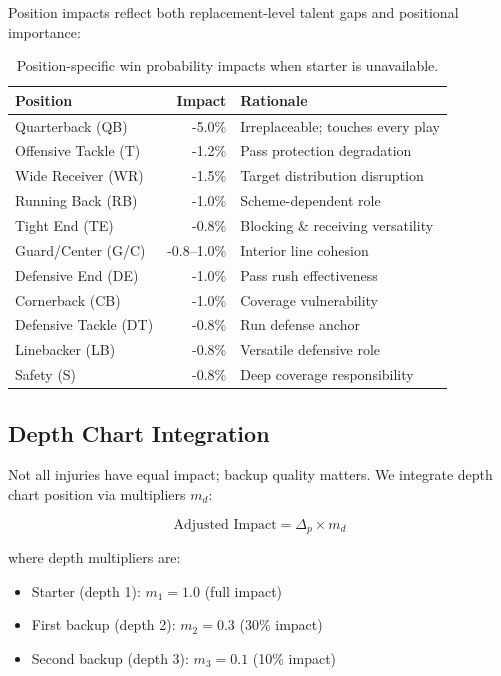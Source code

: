 Position impacts reflect both replacement-level talent gaps and positional importance:

\begin{table}[h]
\centering
\caption[Position-based injury impacts]{Position-specific win probability impacts when starter is unavailable.}
\label{tab:injury-impacts}
\begin{tabular}{lrl}
\toprule
\textbf{Position} & \textbf{Impact} & \textbf{Rationale} \\
\midrule
Quarterback (QB) & -5.0\% & Irreplaceable; touches every play \\
Offensive Tackle (T) & -1.2\% & Pass protection degradation \\
Wide Receiver (WR) & -1.5\% & Target distribution disruption \\
Running Back (RB) & -1.0\% & Scheme-dependent role \\
Tight End (TE) & -0.8\% & Blocking \& receiving versatility \\
Guard/Center (G/C) & -0.8--1.0\% & Interior line cohesion \\
\midrule
Defensive End (DE) & -1.0\% & Pass rush effectiveness \\
Cornerback (CB) & -1.0\% & Coverage vulnerability \\
Defensive Tackle (DT) & -0.8\% & Run defense anchor \\
Linebacker (LB) & -0.8\% & Versatile defensive role \\
Safety (S) & -0.8\% & Deep coverage responsibility \\
\bottomrule
\end{tabular}
\end{table}

\subsection{Depth Chart Integration}

Not all injuries have equal impact; backup quality matters. We integrate depth chart position via multipliers $m_d$:

\begin{equation}
\text{Adjusted Impact} = \Delta_p \times m_d
\end{equation}

where depth multipliers are:
\begin{itemize}
\item Starter (depth 1): $m_1 = 1.0$ (full impact)
\item First backup (depth 2): $m_2 = 0.3$ (30\% impact)
\item Second backup (depth 3): $m_3 = 0.1$ (10\% impact)
\end{itemize}


